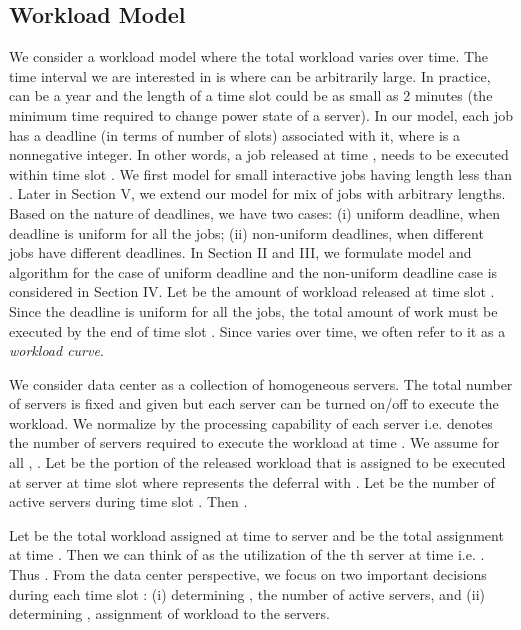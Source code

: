 \documentclass[10pt,conference,compsocconf,letterpaper]{IEEEtran}
\begin{document}
\subsection{Workload Model}
We consider a workload model where the total workload varies over time. The time interval we are interested in is  where  can be arbitrarily large. In practice,  can be a year and the length of a time slot  could be as small as 2 minutes (the minimum time required to change power state of a server). In our model, each job has a deadline  (in terms of number of slots) associated with it, where  is a nonnegative integer. In other words, a job released at time , needs to be executed within time slot . We first model for small interactive jobs having length less than . Later in Section V, we extend our model for mix of jobs with arbitrary lengths. Based on the nature of deadlines, we have two cases: (i) uniform deadline, when deadline is uniform for all the jobs; (ii) non-uniform deadlines, when different jobs have different deadlines. In Section II and III, we formulate model and algorithm for the case of uniform deadline and the non-uniform deadline case is considered in Section IV.
Let  be the amount of workload released at time slot . Since the deadline  is uniform for all the jobs, the total amount of work  must be executed by the end of time slot . Since  varies over time, we often refer to it as a {\it workload curve}.










We consider data center as a collection of homogeneous servers. The total number of servers  is fixed and given but each server can be turned on/off to execute the workload. We normalize  by the processing capability of each server i.e.  denotes the number of servers required to execute the workload at time . We assume for all , . Let  be the portion of the released workload  that is assigned to be executed at server  at time slot  where  represents the deferral with . Let  be the number of active servers during time slot . Then .

Let  be the total workload assigned at time  to server  and  be the total assignment at time . Then we can think of  as the utilization of the th server at time  i.e. . Thus . From the data center perspective, we focus on two important decisions during each time slot : (i) determining , the number of active servers, and (ii) determining , assignment of workload to the servers.
\end{document}
